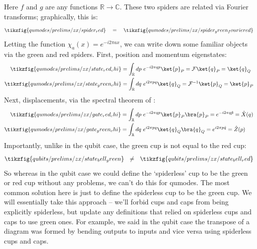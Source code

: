 Here $f$ and $g$ are any functions $\mathbb{R} \to \mathbb{C}$.
These two spiders are related via Fourier transforms; graphically, this is:
\begin{equation}\label{eq:green_red_spiders_related}
    \tikzfig{qumodes/prelims/zx/spider_red}
    \quad=\quad
    \tikzfig{qumodes/prelims/zx/spider_green_fouriered}
\end{equation}
Letting the function $\chi_a(x) = e^{-i2\pi ax}$, we can write down some familiar objects via the green and red spiders.
First, position and momentum eigenstates:
\begin{equation}
    \begin{aligned}
        \tikzfig{qumodes/prelims/zx/state_red_chi}
        &= \int_\mathbb{R} dp\ e^{-i2\pi qp} \ket{p}_P
        = \mathcal{F} \ket{q}_P
        = \ket{q}_Q \\
        \tikzfig{qumodes/prelims/zx/state_green_chi}
        &= \int_\mathbb{R} dq\ e^{i2\pi pq} \ket{q}_Q
        = \mathcal{F}^{-1} \ket{p}_Q
        = \ket{p}_P
    \end{aligned}
\end{equation}
Next, displacements, via the spectral theorem of :
\begin{equation}
    \begin{aligned}
        \tikzfig{qumodes/prelims/zx/gate_red_chi}
        &= \int_\mathbb{R} dp\ e^{-i2\pi qp} \ket{p}_P \bra{p}_P
        = e^{-i2\pi q\hat{p}}
        = \hat{X}(q) \\
        \tikzfig{qumodes/prelims/zx/gate_green_chi}
        &= \int_\mathbb{R} dq\ e^{i2\pi pq} \ket{q}_Q \bra{q}_Q
        = e^{i2\pi p\hat{q}}
        = \hat{Z}(p)
    \end{aligned}
\end{equation}
Importantly, unlike in the qubit case, the green cup is not equal to the red cup:
\begin{equation}
    \tikzfig{qubits/prelims/zx/state_bell_green}
    ~~\neq~~
    \tikzfig{qubits/prelims/zx/state_bell_red}
\end{equation}
So whereas in the qubit case we could define the `spiderless' cup to be the green or red cup without any problems, we can't do this for qumodes.
The most common solution here is just to define the spiderless cup to be the green cup.
We will essentially take this approach -- we'll forbid cups and caps from being explicitly spiderless, but update any definitions that relied on spiderless cups and caps to use green ones.
For example, we said in the qubit case the transpose of a diagram was formed by bending outputs to inputs and vice versa using spiderless cups and caps.

